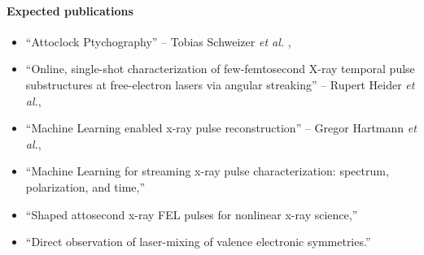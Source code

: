 \paragraph{Expected publications}
\begin{itemize}
\item``Attoclock Ptychography'' -- Tobias Schweizer \textit{et al.} \cite{Feurer2018},
\item ``Online, single-shot characterization of few-femtosecond X-ray temporal pulse substructures at free-electron lasers via angular streaking'' -- Rupert Heider \textit{et al.},
\item ``Machine Learning enabled x-ray pulse reconstruction'' --  Gregor Hartmann \textit{et al.},
\item ``Machine Learning for streaming x-ray pulse characterization: spectrum, polarization, and time,''
\item ``Shaped attosecond x-ray FEL pulses for nonlinear x-ray science,''
\item ``Direct observation of laser-mixing of valence electronic symmetries.''
\end{itemize}
